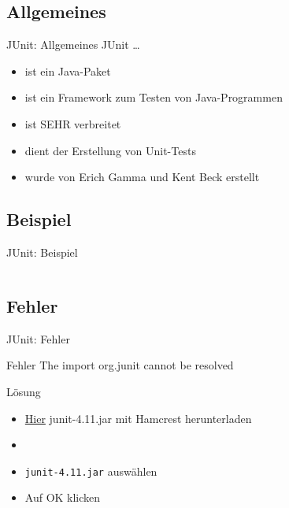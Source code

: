 \documentclass[usepdftitle=false,hyperref={pdfpagelabels=false}]{beamer}
\begin{document}
\subsection{Allgemeines}
\begin{frame}{JUnit: Allgemeines}
    JUnit \dots
    \begin{itemize}[<+->]
        \item ist ein Java-Paket
        \item ist ein Framework zum Testen von  Java-Programmen
        \item ist SEHR verbreitet
        \item dient der Erstellung von Unit-Tests
        \item wurde von Erich Gamma und Kent Beck erstellt
    \end{itemize}
\end{frame}

\subsection{Beispiel}
\begin{frame}{JUnit: Beispiel}
    \inputminted[linenos=true, numbersep=5pt, tabsize=4, fontsize=\tiny, label=LevenshteinCompilationTest.java, frame=lines]{java}{LevenshteinCompilationTest.java}
\end{frame}


\subsection{Fehler}
\begin{frame}{JUnit: Fehler}
    \begin{alertblock}{Fehler}
        The import org.junit cannot be resolved
    \end{alertblock}
    \begin{block}{Lösung}
        \begin{itemize}
            \item \href{https://github.com/KentBeck/junit/downloads}{Hier} junit-4.11.jar mit Hamcrest herunterladen
            \item {}
            \item \texttt{junit-4.11.jar} auswählen
            \item Auf OK klicken
        \end{itemize}
    \end{block}
\end{frame}
\end{document}

